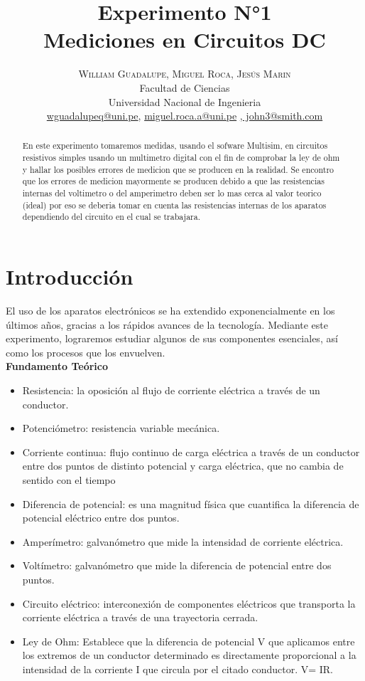 \documentclass[twoside,twocolumn]{article}
\title{Experimento N°1\\Mediciones en Circuitos DC} %
\author{%
\textsc{William Guadalupe}\textsc{, Miguel Roca}\textsc{, Jesús Marin}\\
\normalsize Facultad de Ciencias \\ %
\normalsize Universidad Nacional de Ingenieria \\ %
\normalsize \href{mailto:wguadalupeq@uni.pe}{wguadalupeq@uni.pe},  \href{mailto:miguel.roca.a@uni.pe}{miguel.roca.a@uni.pe} \href{mailto:john@smith.com}{,  john3@smith.com} %
}
\date{ }
\begin{document}
\maketitle

\begin{abstract}

En este experimento tomaremos medidas, usando el sofware Multisim, en circuitos resistivos simples usando un multimetro digital con el fin de comprobar la ley de ohm y hallar los posibles errores de medicion que se producen en la realidad. Se encontro que los errores de medicion mayormente se producen debido a que las resistencias internas del voltimetro o del amperimetro deben ser lo mas cerca al valor teorico (ideal) por eso se deberia tomar en cuenta las resistencias internas de los aparatos dependiendo del circuito en el cual se trabajara.

\end{abstract}

\section{Introducción}
El uso de los aparatos electrónicos se ha extendido exponencialmente en los últimos años, gracias a los rápidos avances de la tecnología. Mediante este experimento, lograremos estudiar algunos de sus componentes esenciales, así como los procesos que los envuelven.\\

\textbf{Fundamento Teórico}
\begin {itemize}
\item Resistencia: la oposición al flujo de corriente eléctrica a través de un conductor.
\item Potenciómetro: resistencia variable mecánica.
\item Corriente continua: flujo continuo de carga eléctrica a través de un conductor entre dos puntos de distinto potencial y carga eléctrica, que no cambia de sentido con el tiempo
\item Diferencia de potencial: es una magnitud física que cuantifica la diferencia de potencial eléctrico entre dos puntos.
\item Amperímetro: galvanómetro que mide la intensidad de corriente eléctrica.
\item Voltímetro: galvanómetro que mide la diferencia de potencial entre dos puntos.
\item Circuito eléctrico:  interconexión de componentes eléctricos que transporta la corriente eléctrica a través de una trayectoria cerrada.
\item Ley de Ohm: Establece que la diferencia de potencial V que aplicamos entre los extremos de un conductor determinado es directamente proporcional a la intensidad de la corriente I que circula por el citado conductor. V= IR.
\end{itemize}
\end{document}
